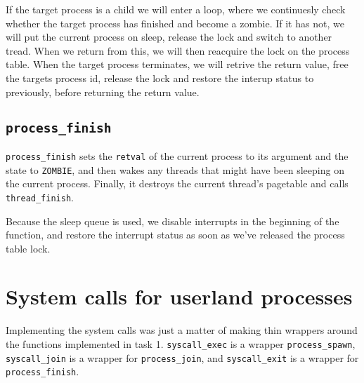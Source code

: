\documentclass{article}
\begin{document}
If the target process is a child we will enter a loop, where we
continuesly check whether the target process has finished and become a
zombie. If it has not, we will put the current process on sleep,
release the lock and switch to another tread. When we return from
this, we will then reacquire the lock on the process table. When the
target process terminates, we will retrive the return value, free the
targets process id, release
the lock and restore the interup status to previously, before returning
the return value.

\subsection{\texttt{process\_finish}}

\texttt{process\_finish} sets the \texttt{retval} of the current process to its argument and the state to \texttt{ZOMBIE}, and then wakes any threads that might have been sleeping on the current process. Finally, it destroys the current thread's pagetable and calls \texttt{thread\_finish}.

Because the sleep queue is used, we disable interrupts in the beginning of the function, and restore the interrupt status as soon as we've released the process table lock.

\section{System calls for userland processes}
Implementing the system calls was just a matter of making thin wrappers around the functions implemented in task 1. \texttt{syscall\_exec} is a wrapper \texttt{process\_spawn}, \texttt{syscall\_join} is a wrapper for \texttt{process\_join}, and \texttt{syscall\_exit} is a wrapper for \texttt{process\_finish}.
\end{document}

